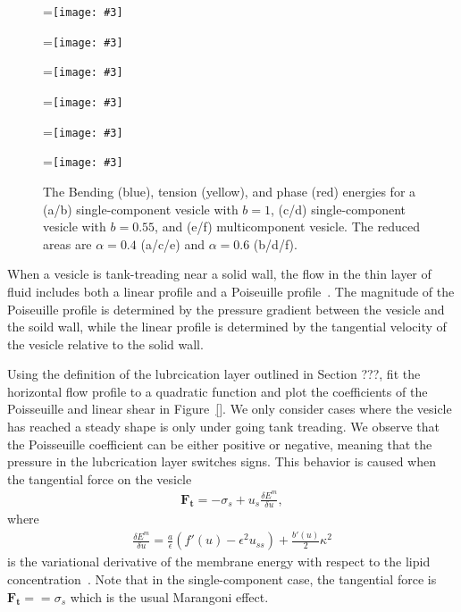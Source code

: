 \documentclass[twoside,twocolumn,9pt]{article}
\renewcommand{\tt}{\mathbf{t}}
\newcommand{\subfigimg}[3][,]{%
  \setbox1=\hbox{\texttt{[image: \#3]}}%
  \leavevmode\rlap{\usebox1}%
  \rlap{\hspace*{0pt}\raisebox{\dimexpr\ht1-0\baselineskip}{\bf
  \normalsize #2}}%
  \phantom{\usebox1}%
}
\begin{document}
\begin{figure}
  \begin{minipage}{0.49\columnwidth}
    \centering
    \subfigimg[width=\textwidth]{(a)}{figures/Fig13a.pdf}
    \subfigimg[width=\textwidth]{(c)}{figures/Fig13c.pdf}
    \subfigimg[width=\textwidth]{(e)}{figures/Fig13e.pdf}
  \end{minipage}
  \hfill
  \begin{minipage}{0.49\columnwidth}
    \centering
    \subfigimg[width=\textwidth]{(b)}{figures/Fig13b.pdf}
    \subfigimg[width=\textwidth]{(d)}{figures/Fig13d.pdf}
    \subfigimg[width=\textwidth]{(f)}{figures/Fig13f.pdf}
  \end{minipage}
  \caption{\label{fig:Energy} \small The Bending (blue), tension
  (yellow), and phase (red) energies for a (a/b) single-component
  vesicle with $b=1$, (c/d) single-component vesicle with $b = 0.55$,
  and (e/f) multicomponent vesicle. The reduced areas are $\alpha = 0.4$
  (a/c/e) and $\alpha = 0.6$ (b/d/f).}
\end{figure}

When a vesicle is tank-treading near a solid wall, the flow in the thin
layer of fluid includes both a linear profile and a Poiseuille
profile~\cite{mis-wis-ber-key-li-tun-law-per-erd-zha-zha-sun-kal-lam-kon2019}.
The magnitude of the Poiseuille profile is determined by the pressure
gradient between the vesicle and the soild wall, while the linear
profile is determined by the tangential velocity of the vesicle relative
to the solid wall.

Using the definition of the lubrcication layer outlined in Section ???,
fit the horizontal flow profile to a quadratic function and plot the
coefficients of the Poisseuille and linear shear in Figure~\ref{}. We
only consider cases where the vesicle has reached a steady shape is only
under going tank treading. We observe that the Poisseuille coefficient
can be either positive or negative, meaning that the pressure in the
lubcrication layer switches signs. This behavior is caused when the
tangential force on the vesicle
\begin{align}
  \mathbf{F}_{\tt} = -\sigma_s + u_s \frac{\delta E^m}{\delta u},
\end{align}
where
\begin{align}
  \frac{\delta E^m}{\delta u} = \frac{a}{\epsilon} 
    (f'(u) - \epsilon^2 u_{ss}) + \frac{b'(u)}{2} \kappa^2
\end{align}
is the variational derivative of the membrane energy with respect to the
lipid concentration~\cite{soh-tse-li-voi-low2010}. Note that in the
single-component case, the tangential force is $\mathbf{F}_\tt =
=\sigma_s$ which is the usual Marangoni effect.
\end{document}
